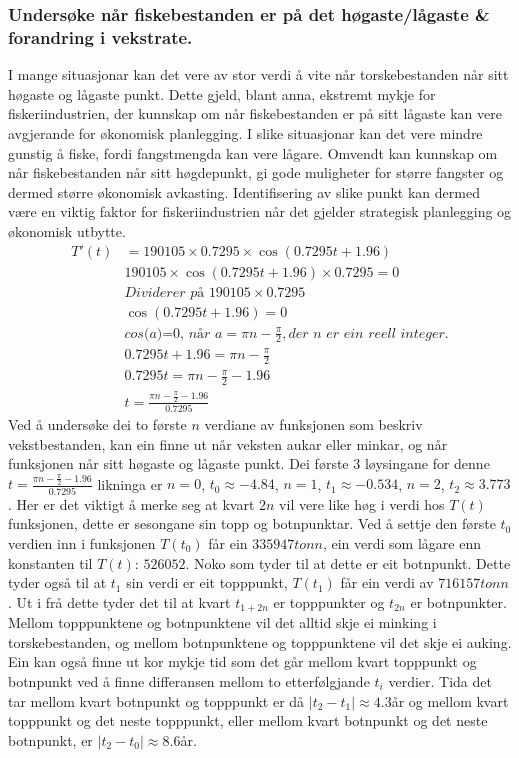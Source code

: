 \documentclass{report}
\begin{document}
\subsubsection{Undersøke når fiskebestanden er på det høgaste/lågaste \& forandring i vekstrate.}
I mange situasjonar kan det vere av stor verdi å vite når torskebestanden når sitt høgaste og lågaste punkt. Dette gjeld, blant anna, ekstremt mykje for fiskeriindustrien, der kunnskap om når fiskebestanden er på sitt lågaste kan vere avgjerande for økonomisk planlegging. I slike situasjonar kan det vere mindre gunstig å fiske, fordi fangstmengda kan vere lågare. Omvendt kan kunnskap om når fiskebestanden når sitt høgdepunkt, gi gode muligheter for større fangster og dermed større økonomisk avkasting. Identifisering av slike punkt kan dermed være en viktig faktor for fiskeriindustrien når det gjelder strategisk planlegging og økonomisk utbytte.
\begin{align*} 
    T'(t) &= 190105 \times 0.7295 \times \cos(0.7295t+1.96) \\
    &190105 \times \cos(0.7295t+1.96)\times 0.7295 =0 \\
    & \textit{Dividerer på } 190105\times 0.7295 \\
    &\cos(0.7295t+1.96) =0 \\
    & \textit{cos(a)=0, når } a=\pi n-\frac{\pi}{2}, \textit{der n er ein reell integer.}\\
    &0.7295t+1.96 = \pi n -\frac{\pi}{2} \\ 
    &0.7295t = \pi n - \frac{\pi}{2}-1.96 \\ 
    &t = \frac{\pi n - \frac{\pi}{2}-1.96}{0.7295}
\end{align*}
Ved å undersøke dei to første $n$ verdiane av funksjonen som beskriv vekstbestanden, kan ein finne ut når veksten aukar eller minkar, og når funksjonen når sitt høgaste og lågaste punkt.
Dei første 3 løysingane for denne $t=\frac{\pi n - \frac{\pi}{2}-1.96}{0.7295}$ likninga er $n=0$, $t_0\approx -4.84$, $n=1$, $t_1\approx -0.534$, $n=2$, $t_2\approx 3.773$.
Her er det viktigt å merke seg at kvart $2n$ vil vere like høg i verdi hos $T(t)$ funksjonen, dette er sesongane sin topp og botnpunktar.
Ved å settje den første $t_0$ verdien inn i funksjonen $T(t_0)$ får ein $335947tonn$, ein verdi som lågare enn konstanten til $T(t)$: $526052$. Noko som tyder til at dette er eit botnpunkt.
Dette tyder også til at $t_1$ sin verdi er eit topppunkt, $T(t_1)$ får ein verdi av $716157tonn$.
Ut i frå dette tyder det til at kvart $t_{1+2n}$ er topppunkter og $t_{2n}$ er botnpunkter. Mellom topppunktene og botnpunktene vil det alltid skje ei minking i torskebestanden, og mellom botnpunktene og topppunktene vil det skje ei auking.
Ein kan også finne ut kor mykje tid som det går mellom kvart topppunkt og botnpunkt ved å finne differansen mellom to etterfølgjande $t_i$ verdier.
Tida det tar mellom kvart botnpunkt og topppunkt er då $|t_2 - t_1| \approx 4.3$år og mellom kvart topppunkt og det neste topppunkt, eller mellom kvart botnpunkt og det neste botnpunkt, er $|t_2-t_0| \approx 8.6$år.
\end{document}
